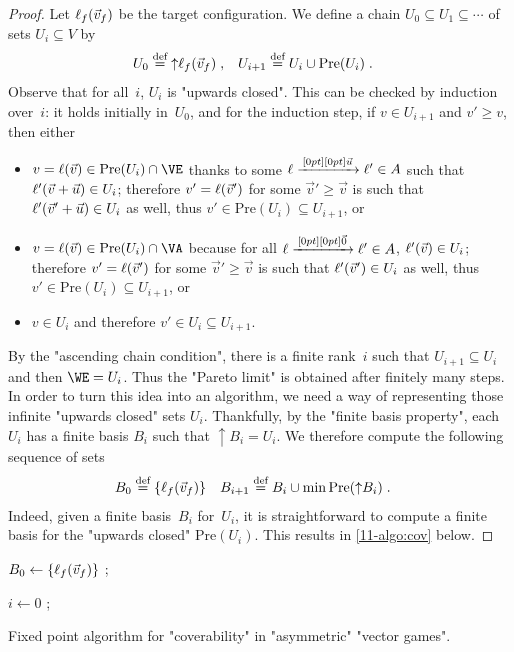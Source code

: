 \begin{proof}
Let $\ell_f(\vec v_f)$ be the target configuration.  We define a
chain $U_0\subseteq U_1\subseteq\cdots$ of sets $U_i\subseteq V$ by
\begin{align*}
  U_0&\stackrel{\!\,\!\,{{\textrm{def}}}}{=}{\uparrow}\ell_f(\vec v_f)\;,&
  U_{i+1}&\stackrel{\!\,\!\,{{\textrm{def}}}}{=} U_i\cup\mathrm{Pre}(U_i)\;.
\end{align*}
Observe that for all~$i$, $U_i$ is "upwards closed".  This can be
checked by induction over~$i$: it holds initially in~$U_0$, and for
the induction step, if $v\in U_{i+1}$ and $v'\geq v$, then either
\begin{itemize}
\item $v=\loc(\vec v)\in\mathrm{Pre}(U_i)\cap\VE$ thanks to some
  $\ell\xrightarrow{\,[0pt][0pt]{\scriptsize{\vec u}}\,}\ell'\in A$ such that
  $\ell'(\vec v+\vec u)\in U_i$; therefore $v'=\ell(\vec v')$ for some
  $\vec v'\geq \vec v$ is such that $\ell'(\vec v'+\vec u)\in U_i$ as
  well, thus $v'\in \mathrm{Pre}(U_i)\subseteq U_{i+1}$, or
\item $v=\loc(\vec v)\in\mathrm{Pre}(U_i)\cap\VA$ because for all
  $\ell\xrightarrow{\,[0pt][0pt]{\scriptsize{\vec 0}}\,}\ell'\in A$, $\ell'(\vec v)\in U_i$; therefore
  $v'=\ell(\vec v')$ for some $\vec v'\geq \vec v$ is such that
  $\ell'(\vec v')\in U_i$ as well, thus
  $v'\in \mathrm{Pre}(U_i)\subseteq U_{i+1}$, or
\item $v\in U_i$ and therefore $v'\in U_i\subseteq U_{i+1}$.
\end{itemize}

By the "ascending chain condition", there is a finite rank~$i$ such
that $U_{i+1}\subseteq U_i$ and then $\WE=U_i$.  Thus the
"Pareto limit" is obtained after finitely many steps.
In order to turn this idea into an algorithm, we need a way of
representing those infinite "upwards closed" sets $U_i$.  Thankfully,
by the "finite basis property", each $U_i$ has a finite basis $B_i$
such that ${\uparrow}B_i=U_i$.  We therefore compute the following
sequence of sets
\begin{align*}
  B_0&\stackrel{\!\,\!\,{{\textrm{def}}}}{=}\{\ell_f(\vec v_f)\}&B_{i+1}&\stackrel{\!\,\!\,{{\textrm{def}}}}{=}
                                       B_i\cup\min\mathrm{Pre}({\uparrow}B_i)\;.
\end{align*}
Indeed, given a finite basis~$B_i$ for~$U_i$, it is straightforward to
compute a finite basis for the "upwards closed" $\mathrm{Pre}(U_i)$.
This results in \cref{11-algo:cov} below.
\end{proof}

\begin{algorithm}

$B_0 \leftarrow \{\ell_f(\vec v_f)\}$ ;

$i \leftarrow 0$ ;
     

\caption{Fixed point algorithm for "coverability" in "asymmetric" "vector
  games".}
\label{11-algo:cov}
\end{algorithm}


